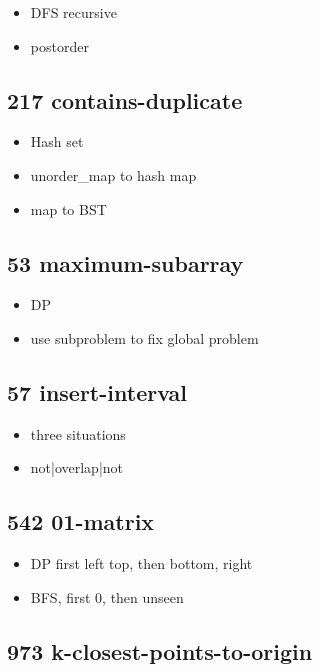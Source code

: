 \begin{itemize}
	\item DFS recursive
	\item postorder
\end{itemize}

\subsection{217 contains-duplicate}

\begin{itemize}
	\item Hash set
	\item unorder\_map to hash map
	\item map to BST
\end{itemize}

\subsection{53 maximum-subarray}

\begin{itemize}
	\item DP
	\item use subproblem to fix global problem
\end{itemize}

\subsection{57 insert-interval}

\begin{itemize}
	\item three situations
	\item not|overlap|not
\end{itemize}

\subsection{542 01-matrix}

\begin{itemize}
	\item DP first left top, then bottom, right
	\item BFS, first 0, then unseen
\end{itemize}

\subsection{973 k-closest-points-to-origin}

